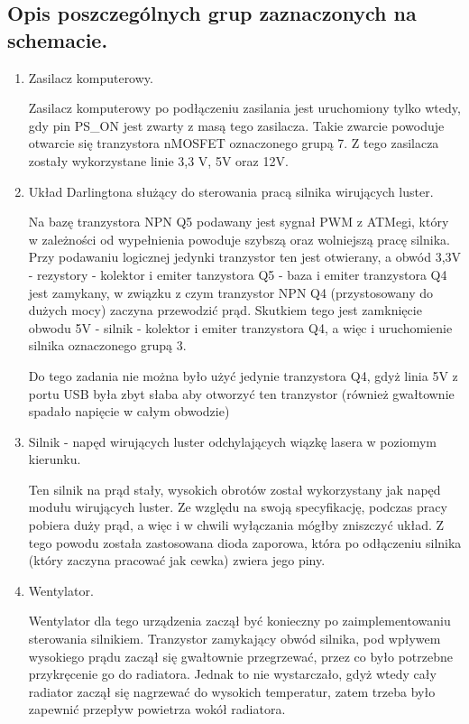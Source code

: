 \documentclass[a4paper,oneside,11pt]{report}
\begin{document}
\subsection{Opis poszczególnych grup zaznaczonych na schemacie.}
\begin{enumerate}[1.]
\item Zasilacz komputerowy.

Zasilacz komputerowy po podłączeniu zasilania jest uruchomiony tylko wtedy, gdy pin PS\_ON jest zwarty z masą tego zasilacza. Takie zwarcie powoduje otwarcie się tranzystora nMOSFET oznaczonego grupą 7. Z tego zasilacza zostały wykorzystane linie 3,3 V, 5V oraz 12V.

\item Układ Darlingtona służący do sterowania pracą silnika wirujących luster.

Na bazę tranzystora NPN Q5 podawany jest sygnał PWM z ATMegi, który w zależności od wypełnienia powoduje szybszą oraz wolniejszą pracę silnika. Przy podawaniu logicznej jedynki tranzystor ten jest otwierany, a obwód 3,3V - rezystory - kolektor i emiter tanzystora Q5 - baza i emiter tranzystora Q4 jest zamykany, w związku z czym tranzystor NPN Q4 (przystosowany do dużych mocy) zaczyna przewodzić prąd. Skutkiem tego jest zamknięcie obwodu 5V - silnik - kolektor i emiter tranzystora Q4, a więc i uruchomienie silnika oznaczonego grupą 3.

Do tego zadania nie można było użyć jedynie tranzystora Q4, gdyż linia 5V z portu USB była zbyt słaba aby otworzyć ten tranzystor (również gwałtownie spadało napięcie w całym obwodzie)

\item Silnik - napęd wirujących luster odchylających wiązkę lasera w poziomym kierunku.

Ten silnik na prąd stały, wysokich obrotów został wykorzystany jak napęd modułu wirujących luster. Ze względu na swoją specyfikację, podczas pracy pobiera duży prąd, a więc i w chwili wyłączania mógłby zniszczyć układ. Z tego powodu została zastosowana dioda zaporowa, która po odłączeniu silnika (który zaczyna pracować jak cewka) zwiera jego piny.

\item Wentylator.

Wentylator dla tego urządzenia zaczął być konieczny po zaimplementowaniu sterowania silnikiem. Tranzystor zamykający obwód silnika, pod wpływem wysokiego prądu zaczął się gwałtownie przegrzewać, przez co było potrzebne przykręcenie go do radiatora. Jednak to nie wystarczało, gdyż wtedy cały radiator zaczął się nagrzewać do wysokich temperatur, zatem trzeba było zapewnić przepływ powietrza wokół radiatora.


\end{enumerate}
\end{document}
